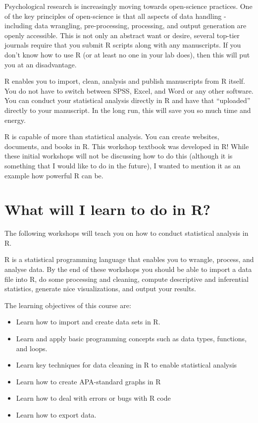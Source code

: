 \documentclass[
]{book}
\providecommand{\tightlist}{%
  \setlength{\itemsep}{0pt}\setlength{\parskip}{0pt}}
\begin{document}
Psychological research is increasingly moving towards open-science practices. One of the key principles of open-science is that all aspects of data handling - including data wrangling, pre-processing, processing, and output generation are openly accessible. This is not only an abstract want or desire, several top-tier journals require that you submit R scripts along with any manuscripts. If you don't know how to use R (or at least no one in your lab does), then this will put you at an disadvantage.

R enables you to import, clean, analysis and publish manuscripts from R itself. You do not have to switch between SPSS, Excel, and Word or any other software. You can conduct your statistical analysis directly in R and have that ``uploaded'' directly to your manuscript. In the long run, this will save you so much time and energy.

R is capable of more than statistical analysis. You can create websites, documents, and books in R. This workshop textbook was developed in R! While these initial workshops will not be discussing how to do this (although it is something that I would like to do in the future), I wanted to mention it as an example how powerful R can be.

\hypertarget{what-will-i-learn-to-do-in-r}{%
\section{What will I learn to do in R?}\label{what-will-i-learn-to-do-in-r}}

The following workshops will teach you on how to conduct statistical analysis in R.

R is a statistical programming language that enables you to wrangle, process, and analyse data. By the end of these workshops you should be able to import a data file into R, do some processing and cleaning, compute descriptive and inferential statistics, generate nice visualizations, and output your results.

The learning objectives of this course are:

\begin{itemize}
\tightlist
\item
  Learn how to import and create data sets in R.
\item
  Learn and apply basic programming concepts such as data types, functions, and loops.
\item
  Learn key techniques for data cleaning in R to enable statistical analysis
\item
  Learn how to create APA-standard graphs in R
\item
  Learn how to deal with errors or bugs with R code
\item
  Learn how to export data.
\end{itemize}
\end{document}
